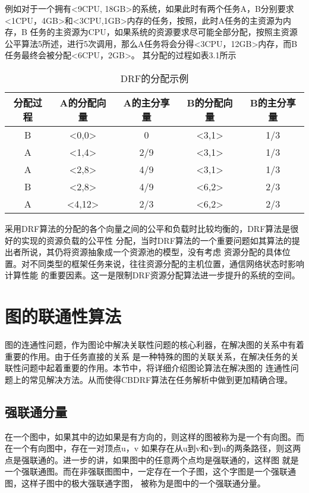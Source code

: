 例如对于一个拥有<9CPU, 18GB>的系统，如果此时有两个任务A，B分别要求<1CPU，4GB>和<3CPU,1GB>内存的任务，按照，此时A任务的主资源为内存，B
任务的主资源为CPU，如果系统的资源要求尽可能全部分配，按照主资源公平算法5所述，进行5次调用，那么A任务将会分得<3CPU，12GB>内存，而B任务最终会被分配<6CPU，2GB>。
其分配的过程如表3.1所示
\begin{table}[htp]
\begin{center}
\caption{DRF的分配示例}
\begin{tabular}{|c|c|c|c|c|}
\hline
分配过程 & A的分配向量&A的主分享量&B的分配向量&B的主分享量\\
\hline
B & <0,0> & 0 & <3,1> & 1/3\\
\hline
A & <1,4> & 2/9 & <3,1> & 1/3\\
\hline
A & <2,8> & 4/9 & <3,1> &1/3\\
\hline
B & <2,8> & 4/9 & <6,2> & 2/3\\
\hline
A & <4,12> & 2/3 & <6,2> & 2/3\\
\hline
\end{tabular}
\end{center}
\label{tab:drfexample}
\end{table}

采用DRF算法的分配的各个向量之间的公平和负载时比较均衡的，DRF算法是很好的实现的资源负载的公平性
分配，当时DRF算法的一个重要问题如其算法的提出者所说，其仍将资源抽象成一个资源池的模型，没有考虑
资源分配的具体位置。对不同类型的框架任务来说，往往资源分配的主机位置，通信网络状态时影响计算性能
的重要因素。这一是限制DRF资源分配算法进一步提升的系统的空间。

\section{图的联通性算法}
图的连通性问题，作为图论中解决关联性问题的核心利器，在解决图的关系中有着重要的作用。由于任务直接的关系
是一种特殊的图的关联关系，在解决任务的关联性问题中起着重要的作用。本节中，将详细介绍图论算法在解决图的
连通性问题上的常见解决方法。从而使得CBDRF算法在任务解析中做到更加精确合理。
\subsection{强联通分量}
在一个图中，如果其中的边如果是有方向的，则这样的图被称为是一个有向图。而在一个有向图中，存在一对顶点u，v
如果存在从u到v和v到u的两条路径，则这两点是强联通的。进一步的讲，如果图中的任意两个点均是强联通的，这样图
就是一个强联通图。而在非强联图图中，一定存在一个子图，这个字图是一个强联通图，这样子图中的极大强联通字图，
被称为是图中的一个强联通分量。


